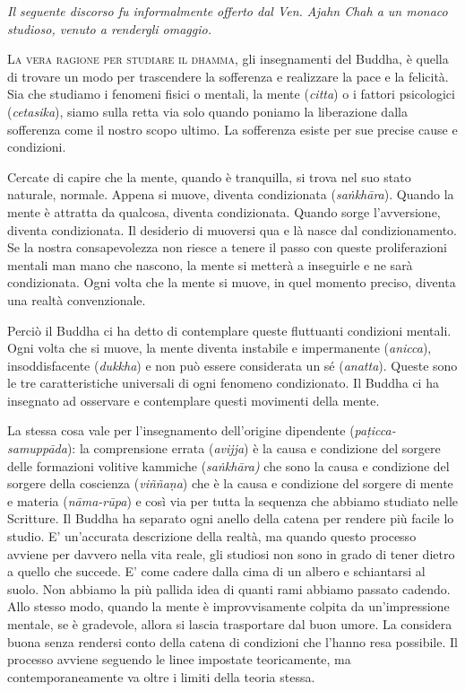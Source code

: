 
{\hspace*{17pt}
\begin{minipage}{0.9\linewidth}
\small\itshape
Il seguente discorso fu informalmente offerto dal Ven. Ajahn Chah a un
monaco studioso, venuto a rendergli omaggio.
\end{minipage}
}

\vspace*{0.8\baselineskip}

{\scshape La vera ragione per studiare il dhamma}, gli insegnamenti del Buddha, è
quella di trovare un modo per trascendere la sofferenza e realizzare la
pace e la felicità. Sia che studiamo i fenomeni fisici o mentali, la
mente (\emph{citta}) o i fattori psicologici (\emph{cetasika}), siamo
sulla retta via solo quando poniamo la liberazione dalla sofferenza come
il nostro scopo ultimo. La sofferenza esiste per sue precise cause e
condizioni.

Cercate di capire che la mente, quando è tranquilla, si trova nel suo
stato naturale, normale. Appena si muove, diventa condizionata
(\emph{saṅkhāra}). Quando la mente è attratta da qualcosa, diventa
condizionata. Quando sorge l'avversione, diventa condizionata. Il
desiderio di muoversi qua e là nasce dal condizionamento. Se la nostra
consapevolezza non riesce a tenere il passo con queste proliferazioni
mentali man mano che nascono, la mente si metterà a inseguirle e ne sarà
condizionata. Ogni volta che la mente si muove, in quel momento preciso,
diventa una realtà convenzionale.

Perciò il Buddha ci ha detto di contemplare queste fluttuanti condizioni
mentali. Ogni volta che si muove, la mente diventa instabile e
impermanente (\emph{anicca}), insoddisfacente (\emph{dukkha}) e non può
essere considerata un sé (\emph{anatta}). Queste sono le tre
caratteristiche universali di ogni fenomeno condizionato. Il Buddha ci
ha insegnato ad osservare e contemplare questi movimenti della mente.

La stessa cosa vale per l'insegnamento dell'origine dipendente
(\emph{paṭicca-samuppāda}): la comprensione errata (\emph{avijja}) è la
causa e condizione del sorgere delle formazioni volitive kammiche
(\emph{saṅkhāra)} che sono la causa e condizione del sorgere della
coscienza (\emph{viññaṇa}) che è la causa e condizione del sorgere di
mente e materia (\emph{nāma-rūpa}) e così via per tutta la sequenza che
abbiamo studiato nelle Scritture. Il Buddha ha separato ogni anello
della catena per rendere più facile lo studio. E' un'accurata
descrizione della realtà, ma quando questo processo avviene per davvero
nella vita reale, gli studiosi non sono in grado di tener dietro a
quello che succede. E' come cadere dalla cima di un albero e schiantarsi
al suolo. Non abbiamo la più pallida idea di quanti rami abbiamo passato
cadendo. Allo stesso modo, quando la mente è improvvisamente colpita da
un'impressione mentale, se è gradevole, allora si lascia trasportare dal
buon umore. La considera buona senza rendersi conto della catena di
condizioni che l'hanno resa possibile. Il processo avviene seguendo le
linee impostate teoricamente, ma contemporaneamente va oltre i limiti
della teoria stessa.

